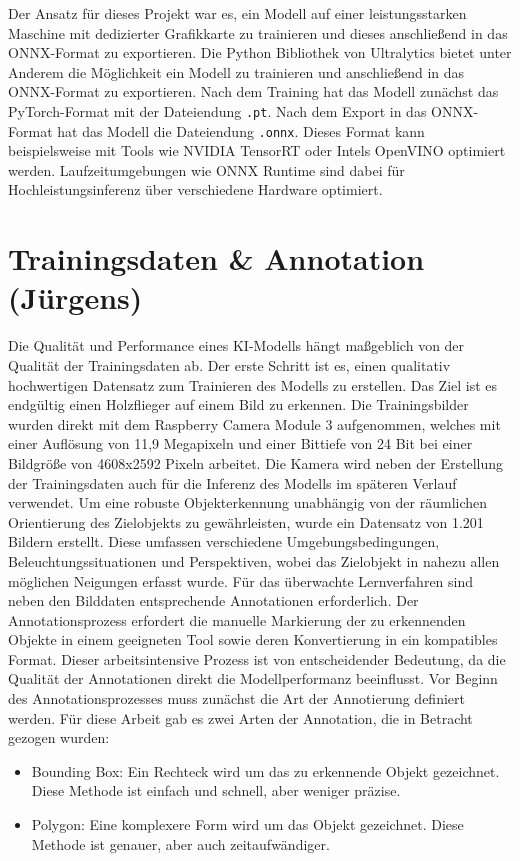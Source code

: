Der Ansatz für dieses Projekt war es, ein Modell auf einer leistungsstarken Maschine mit dedizierter Grafikkarte zu trainieren und dieses anschließend in das ONNX-Format zu exportieren. Die Python Bibliothek von Ultralytics bietet unter Anderem die Möglichkeit ein Modell zu trainieren und anschließend in das ONNX-Format zu exportieren. Nach dem Training hat das Modell zunächst das PyTorch-Format mit der Dateiendung \texttt{.pt}.
Nach dem Export in das ONNX-Format hat das Modell die Dateiendung \texttt{.onnx}. Dieses Format kann beispielsweise mit Tools wie NVIDIA TensorRT oder Intels OpenVINO optimiert werden. Laufzeitumgebungen wie ONNX Runtime sind dabei für Hochleistungsinferenz über verschiedene Hardware optimiert. \cite{ultralyticsGlossaryONNX}


\section{Trainingsdaten \& Annotation (Jürgens)}
Die Qualität und Performance eines KI-Modells hängt maßgeblich von der Qualität der Trainingsdaten ab. Der erste Schritt ist es, einen qualitativ hochwertigen Datensatz zum Trainieren des Modells zu erstellen. Das Ziel ist es endgültig einen Holzflieger auf einem Bild zu erkennen. Die Trainingsbilder wurden direkt mit dem Raspberry Camera Module 3 aufgenommen, welches mit einer Auflösung von 11,9 Megapixeln und einer Bittiefe von 24 Bit bei einer Bildgröße von 4608x2592 Pixeln arbeitet. \cite{raspberrypi5cammodule3} Die Kamera wird neben der Erstellung der Trainingsdaten auch für die Inferenz des Modells im späteren Verlauf verwendet. 
Um eine robuste Objekterkennung unabhängig von der räumlichen Orientierung des Zielobjekts zu gewährleisten, wurde ein Datensatz von 1.201 Bildern erstellt. Diese umfassen verschiedene Umgebungsbedingungen, Beleuchtungssituationen und Perspektiven, wobei das Zielobjekt in nahezu allen möglichen Neigungen erfasst wurde.
Für das überwachte Lernverfahren sind neben den Bilddaten entsprechende Annotationen erforderlich. Der Annotationsprozess erfordert die manuelle Markierung der zu erkennenden Objekte in einem geeigneten Tool sowie deren Konvertierung in ein kompatibles Format. Dieser arbeitsintensive Prozess ist von entscheidender Bedeutung, da die Qualität der Annotationen direkt die Modellperformanz beeinflusst. Vor Beginn des Annotationsprozesses muss zunächst die Art der Annotierung definiert werden.
Für diese Arbeit gab es zwei Arten der Annotation, die in Betracht gezogen wurden:
\begin{itemize}
  \item Bounding Box: Ein Rechteck wird um das zu erkennende Objekt gezeichnet. Diese Methode ist einfach und schnell, aber weniger präzise.
  \item Polygon: Eine komplexere Form wird um das Objekt gezeichnet. Diese Methode ist genauer, aber auch zeitaufwändiger.
\end{itemize}
